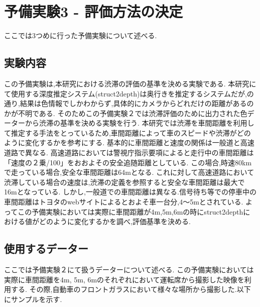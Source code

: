 \newpage
\section{予備実験3 - 評価方法の決定}
ここでは3つめに行った予備実験について述べる.
\subsection{実験内容}
この予備実験は,本研究における渋滞の評価の基準を決める実験である.
本研究にて使用する深度推定システム(struct2depth)\cite{casser2019struct2depth}は奥行きを推定するシステムだが,の通り,結果は色情報でしかわからず,具体的にカメラからどれだけの距離があるのかが不明である.
そのためこの予備実験２では渋滞評価のために出力された色データーから渋滞の基準を決める実験を行う.
本研究では渋滞を車間距離を利用して推定する手法をとっているため,車間距離によって車のスピードや渋滞がどのように変化するかを参考にする.
基本的に車間距離と速度の関係は一般道と高速道路で異なる.
高速道路においては警視庁指示要項によると走行中の車間距離は「速度の２乗/100」をおおよその安全追随距離としている\cite{highway}.
この場合,時速80kmで走っている場合,安全な車間距離は64mとなる.
これに対して高速道路において渋滞している場合の速度は,渋滞の定義を参照すると安全な車間距離は最大で16mとなっている.
しかし,一般道での車間距離は異なる.信号待ち等での停車中の車間距離はトヨタのwebサイトによるとおよそ車一台分,4〜5mとされている\cite{toyota_web}.
よってこの予備実験においては実際に車間距離が4m,5m,6mの時にstruct2depthにおける値がどのように変化するかを調べ,評価基準を決める.


\subsection{使用するデーター}
ここでは予備実験２にて扱うデーターについて述べる.
この予備実験においては実際に車間距離を4m, 5m, 6mのそれぞれにおいて運転席から撮影した映像を利用する.
その際,自動車のフロントガラスにおいて様々な場所から撮影した.以下にサンプルを示す.


